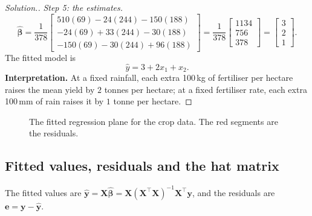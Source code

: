 \documentclass[11pt,a4paper]{article}
\numberwithin{equation}{section}
\theoremstyle{definition}
\newenvironment{solution}
  {\renewcommand{\qedsymbol}{}\begin{proof}[\textit{Solution}.]}
  {\end{proof}}
\begin{document}
\begin{solution}
\emph{Step 5: the estimates.}
\[
\hat{\boldsymbol\beta} = \frac{1}{378}
\begin{bmatrix} 510(69) - 24(244) - 150(188) \\ -24(69) + 33(244) - 30(188) \\ -150(69) - 30(244) + 96(188) \end{bmatrix}
= \frac{1}{378} \begin{bmatrix} 1134 \\ 756 \\ 378 \end{bmatrix}
= \begin{bmatrix} 3 \\ 2 \\ 1 \end{bmatrix} .
\]
The fitted model is
\[
\hat y = 3 + 2x_1 + x_2 .
\]
\textbf{Interpretation.} At a fixed rainfall, each extra 100\,kg of fertiliser per hectare
raises the mean yield by $2$ tonnes per hectare; at a fixed fertiliser rate, each extra
100\,mm of rain raises it by $1$ tonne per hectare.
\end{solution}

\begin{figure}[H]
\centering
{}
\caption{The fitted regression plane for the crop data. The red segments are the residuals.}
\label{fig:plane}
\end{figure}

\subsection{Fitted values, residuals and the hat matrix}
The fitted values are
$\hat{\mathbf{y}} = \mathbf{X}\hat{\boldsymbol\beta} = \mathbf{X}(\mathbf{X}^\top\mathbf{X})^{-1}\mathbf{X}^\top\mathbf{y}$,
and the residuals are $\mathbf{e} = \mathbf{y} - \hat{\mathbf{y}}$.
\end{document}
